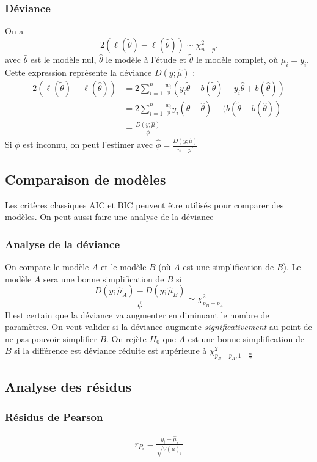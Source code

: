 \documentclass[10pt, french]{article}
\begin{document}
\begin{multicols*}{3}
\subsubsection*{Déviance}
On a
\[2(\ell(\tilde{\theta}) - \ell(\hat{\theta}))  \sim \chi_{n-p'}^2 \]
avec $\bar{\theta}$ est le modèle nul, $\hat{\theta}$ le modèle à l'étude et $\tilde{\theta}$ le modèle complet, où $\hat{\mu}_i = y_i$. Cette expression représente la déviance $D(y ; \hat{\mu})$ : 
\begin{align*}
2(\ell(\tilde{\theta}) - \ell(\hat{\theta}))	& = 2 \sum_{i=1}^{n} \frac{w_i}{\phi} (y_i \tilde{\theta} - b(\tilde{\theta}) - y_i \hat{\theta} + b(\hat{\theta})) \\
&= 2 \sum_{i=1}^{n} \frac{w_i}{\phi} y_i (\tilde{\theta} - \hat{\theta}) - (b(\tilde{\theta} - b(\hat{\theta})) \\
& = \frac{D(y ; \hat{\mu})}{\phi}
\end{align*}
Si $\phi$ est inconnu, on peut l'estimer avec $\hat{\phi} = \frac{D(y ; \hat{\mu})}{n-p'}$

\subsection*{Comparaison de modèles}
Les critères classiques AIC et BIC peuvent être utilisés pour comparer des modèles. On peut aussi faire une analyse de la déviance

\subsubsection*{Analyse de la déviance}
\label{sssec:analyse_deviance}
On compare le modèle $A$ et le modèle $B$ (où $A$ est une simplification de $B$). Le modèle $A$ sera une bonne simplification de $B$ si
\[\frac{D(y ; \hat{\mu}_A) - D(y ; \hat{\mu}_B)}{\phi}  \sim \chi_{p_B - p_A}^2  \]
Il est certain que la déviance va augmenter en diminuant le nombre de paramètres. On veut valider si la déviance augmente \emph{significativement} au point de ne pas pouvoir simplifier $B$. On rejète $H_0$ que $A$ est une bonne simplification de $B$ si la différence est déviance réduite est supérieure à $\chi_{p_B - p_A, 1 - \frac{\alpha}{2}}^2$


\subsection*{Analyse des résidus}

\subsubsection*{Résidus de Pearson}
\begin{align*}
r_{P_i} = \frac{y_i - \hat{\mu}_i}{\sqrt{V(\hat{\mu})_i}}
\end{align*}


\end{multicols*}
\end{document}
